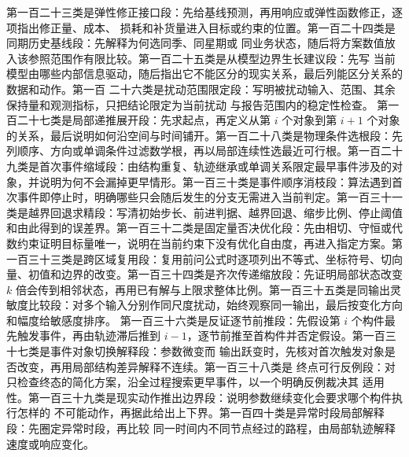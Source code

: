第一百二十三类是弹性修正接口段：先给基线预测，再用响应或弹性函数修正，逐项指出修正量、成本、
损耗和补货量进入目标或约束的位置。第一百二十四类是同期历史基线段：先解释为何选同季、同星期或
同业务状态，随后将方案数值放入该参照范围作有限比较。第一百二十五类是从模型边界生长建议段：先写
当前模型由哪些内部信息驱动，随后指出它不能区分的现实关系，最后列能区分关系的数据和动作。第一百
二十六类是扰动范围限定段：写明被扰动输入、范围、其余保持量和观测指标，只把结论限定为当前扰动
与报告范围内的稳定性检查。
第一百二十七类是局部递推展开段：先求起点，再定义从第 $i$ 个对象到第 $i+1$ 个对象的关系，最后说明如何沿空间与时间铺开。第一百二十八类是物理条件选根段：先列顺序、方向或单调条件过滤数学根，再以局部连续性选最近可行根。第一百二十九类是首次事件缩域段：由结构重复、轨迹继承或单调关系限定最早事件涉及的对象，并说明为何不会漏掉更早情形。第一百三十类是事件顺序消枝段：算法遇到首次事件即停止时，明确哪些只会随后发生的分支无需进入当前判定。第一百三十一类是越界回退求精段：写清初始步长、前进判据、越界回退、缩步比例、停止阈值和由此得到的误差界。第一百三十二类是固定量否决优化段：先由相切、守恒或代数约束证明目标量唯一，说明在当前约束下没有优化自由度，再进入指定方案。第一百三十三类是跨区域复用段：复用前问公式时逐项列出不等式、坐标符号、切向量、初值和边界的改变。第一百三十四类是齐次传递缩放段：先证明局部状态改变 $k$ 倍会传到相邻状态，再用已有解与上限求整体比例。第一百三十五类是同输出灵敏度比较段：对多个输入分别作同尺度扰动，始终观察同一输出，最后按变化方向和幅度给敏感度排序。
第一百三十六类是反证逐节前推段：先假设第 $i$ 个构件最先触发事件，再由轨迹滞后推到
$i-1$，逐节前推至首构件并否定假设。第一百三十七类是事件对象切换解释段：参数微变而
输出跃变时，先核对首次触发对象是否改变，再用局部结构差异解释不连续。第一百三十八类是
终点可行反例段：对只检查终态的简化方案，沿全过程搜索更早事件，以一个明确反例裁决其
适用性。第一百三十九类是现实动作推出边界段：说明参数继续变化会要求哪个构件执行怎样的
不可能动作，再据此给出上下界。第一百四十类是异常时段局部解释段：先圈定异常时段，再比较
同一时间内不同节点经过的路程，由局部轨迹解释速度或响应变化。

